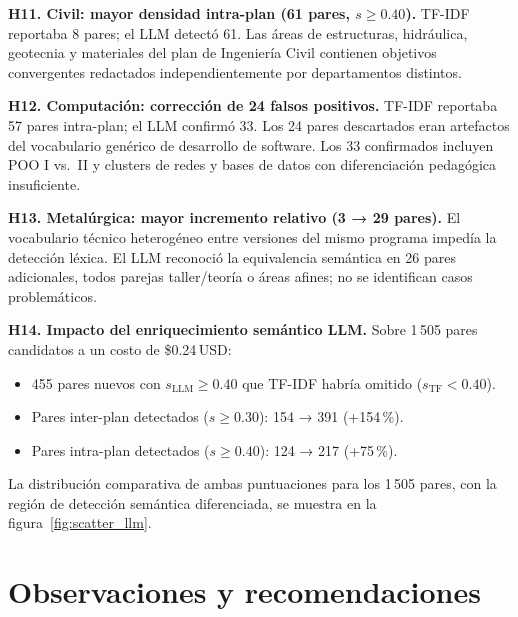 \documentclass[11pt,a4paper]{article}
\begin{document}
\begin{hallazgo}
\textbf{H11. Civil: mayor densidad intra-plan (61 pares, $s \geq 0.40$).}
TF-IDF reportaba 8 pares; el LLM detectó 61.
Las áreas de estructuras, hidráulica, geotecnia y materiales del plan de Ingeniería Civil contienen objetivos convergentes redactados independientemente por departamentos distintos.
\end{hallazgo}

\begin{hallazgo}
\textbf{H12. Computación: corrección de 24 falsos positivos.}
TF-IDF reportaba 57 pares intra-plan; el LLM confirmó 33.
Los 24 pares descartados eran artefactos del vocabulario genérico de desarrollo de software.
Los 33 confirmados incluyen POO I vs.\ II y clusters de redes y bases de datos con diferenciación pedagógica insuficiente.
\end{hallazgo}

\begin{hallazgo}
\textbf{H13. Metalúrgica: mayor incremento relativo (3 → 29 pares).}
El vocabulario técnico heterogéneo entre versiones del mismo programa impedía la detección léxica.
El LLM reconoció la equivalencia semántica en 26 pares adicionales, todos parejas taller/teoría o áreas afines; no se identifican casos problemáticos.
\end{hallazgo}

\begin{hallazgo}
\textbf{H14. Impacto del enriquecimiento semántico LLM.}
Sobre 1\,505 pares candidatos a un costo de \$0.24\,USD:
\begin{itemize}[nosep,leftmargin=1.5em]
  \item 455 pares nuevos con $s_{\mathrm{LLM}} \geq 0.40$ que TF-IDF habría omitido ($s_{\mathrm{TF}} < 0.40$).
  \item Pares inter-plan detectados ($s \geq 0.30$): 154 → 391 (+154\,\%).
  \item Pares intra-plan detectados ($s \geq 0.40$): 124 → 217 (+75\,\%).
\end{itemize}
La distribución comparativa de ambas puntuaciones para los 1\,505 pares, con la región de
detección semántica diferenciada, se muestra en la figura~\ref{fig:scatter_llm}.
\end{hallazgo}

\section{Observaciones y recomendaciones}
\end{document}
